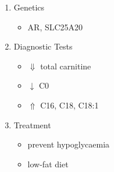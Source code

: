 \documentclass{scrartcl}
\begin{document}
\begin{enumerate}
\item Genetics
\label{sec:org34ce651}
\begin{itemize}
\item AR, SLC25A20
\end{itemize}
\item Diagnostic Tests
\label{sec:orgb572532}
\begin{itemize}
\item \(\Downarrow\) total carnitine
\item \(\downarrow\) C0
\item \(\Uparrow\) C16, C18, C18:1
\end{itemize}
\item Treatment
\label{sec:org2e94061}
\begin{itemize}
\item prevent hypoglycaemia
\item low-fat diet
\end{itemize}
\end{enumerate}
\end{document}
